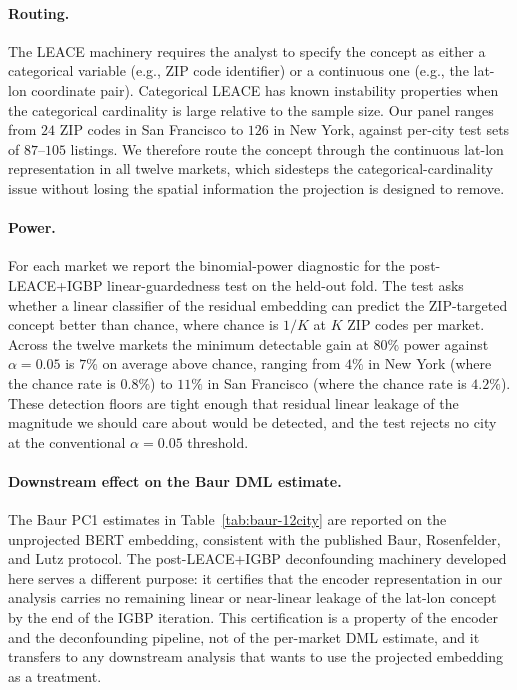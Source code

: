 \paragraph{Routing.} The LEACE machinery requires the analyst to
specify the concept as either a categorical variable (e.g., ZIP code
identifier) or a continuous one (e.g., the lat-lon coordinate pair).
Categorical LEACE has known instability properties when the
categorical cardinality is large relative to the sample size. Our
panel ranges from $24$ ZIP codes in San Francisco to $126$ in New
York, against per-city test sets of $87$--$105$ listings. We
therefore route the concept through the continuous lat-lon
representation in all twelve markets, which sidesteps the
categorical-cardinality issue without losing the spatial information
the projection is designed to remove.

\paragraph{Power.} For each market we report the binomial-power
diagnostic for the post-LEACE+IGBP linear-guardedness test on the
held-out fold. The test asks whether a linear classifier of the
residual embedding can predict the ZIP-targeted concept better than
chance, where chance is $1/K$ at $K$ ZIP codes per market. Across
the twelve markets the minimum detectable gain at $80\%$ power
against $\alpha = 0.05$ is $7\%$ on average above chance, ranging
from $4\%$ in New York (where the chance rate is $0.8\%$) to $11\%$
in San Francisco (where the chance rate is $4.2\%$). These detection
floors are tight enough that residual linear leakage of the magnitude
we should care about would be detected, and the test rejects no city
at the conventional $\alpha = 0.05$ threshold.

\paragraph{Downstream effect on the Baur DML estimate.} The Baur PC1
estimates in Table~\ref{tab:baur-12city} are reported on the
unprojected BERT embedding, consistent with the published Baur,
Rosenfelder, and Lutz protocol. The post-LEACE+IGBP deconfounding
machinery developed here serves a different purpose: it certifies
that the encoder representation in our analysis carries no remaining
linear or near-linear leakage of the lat-lon concept by the end of
the IGBP iteration. This certification is a property of the encoder
and the deconfounding pipeline, not of the per-market DML estimate,
and it transfers to any downstream analysis that wants to use the
projected embedding as a treatment.

